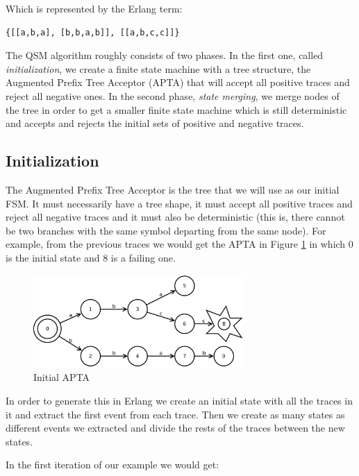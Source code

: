 \documentclass[]{sigplanconf}
\begin{document}
\noindent
Which is represented by the Erlang term:
\begin{verbatim}
{[[a,b,a], [b,b,a,b]], [[a,b,c,c]]}
\end{verbatim}

The QSM algorithm roughly consists of two phases\cite{dupont2008qsm}. In the first one,
called \textit{initialization}, we create a finite state machine with a tree structure, the  Augmented Prefix Tree Acceptor (APTA)
that will accept all positive traces and reject all negative ones. In the
second phase, \textit{state merging}, we merge nodes of the tree in order to get
a smaller finite state machine which is still deterministic and accepts and rejects the initial sets of positive and negative traces. 

\subsection{Initialization}

The Augmented Prefix Tree Acceptor is the tree that we will use as
our initial FSM. It must necessarily have a tree shape, it must
accept all positive traces and reject all negative traces and
it must also be deterministic (this is, there cannot be two
branches with the same symbol departing from the same node).
For example, from the previous traces we would get the 
APTA in Figure \ref{fsm1} in which 0 is the initial state and 8 is a failing one.

\begin{figure}
\begin{center}
\includegraphics[width=8cm]{pictures/fsm1.pdf}
\end{center}
\caption{Initial APTA}
\label{fsm1}
\end{figure}


In order to generate this in Erlang we create an initial
state with all the traces in it and extract the first event
from each trace. Then we create as many states as different
events we extracted and divide the rests of the traces
between the new states.

In the first iteration of our example we would get:
\end{document}
